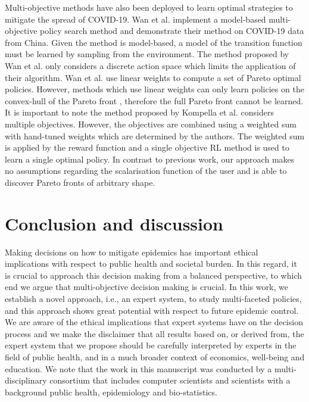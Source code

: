 \documentclass{article}
\renewcommand{\cite}[1]{\citep{#1}}
\begin{document}
Multi-objective methods have also been deployed to learn optimal strategies to mitigate the spread of COVID-19. Wan et al. \cite{wan2021multi} implement a model-based multi-objective policy search method and demonstrate their method on COVID-19 data from China. Given the method is model-based, a model of the transition function must be learned by sampling from the environment. The method proposed by Wan et al. \cite{wan2021multi} only considers a discrete action space which limits the application of their algorithm. Wan et al. \cite{wan2021multi} use linear weights to compute a set of Pareto optimal policies. However, methods which use linear weights can only learn policies on the convex-hull of the Pareto front \cite{vamplew2008limitations}, therefore the full Pareto front cannot be learned. It is important to note the method proposed by Kompella et al. \cite{kompella2020reinforcement} considers multiple objectives. However, the objectives are combined using a weighted sum with hand-tuned weights which are determined by the authors. The weighted sum is applied by the reward function and a single objective RL method is used to learn a single optimal policy.
In contrast to previous work, our approach makes no assumptions regarding the scalarisation function of the user and is able to discover Pareto fronts of arbitrary shape.

\section{Conclusion and discussion}
Making decisions on how to mitigate epidemics has important ethical implications with respect to public health and societal burden. In this regard, it is crucial to approach this decision making from a balanced perspective, to which end we argue that multi-objective decision making is crucial. In this work, we establish a novel approach, i.e., an expert system, to study multi-faceted policies, and this approach shows great potential with respect to future epidemic control. We are aware of the ethical implications that expert systems have on the decision process and we make the disclaimer that all results based on, or derived from, the expert system that we propose should be carefully interpreted by experts in the field of public health, and in a much broader context of economics, well-being and education. We note that the work in this manuscript was conducted by a multi-disciplinary consortium that includes computer scientists and scientists with a background public health, epidemiology and bio-statistics.
\end{document}
